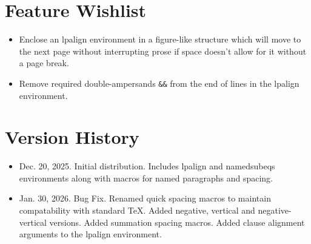 \documentclass{article}
\begin{document}
\section{Feature Wishlist}
\begin{itemize}
	\item[$\boxdot$] Enclose an \textsf{lpalign} environment in a figure-like structure which will move to the next page without interrupting prose if space doesn't allow for it without a page break. 
	\item[$\boxdot$] Remove required double-ampersands \verb|&&| from the end of lines in the \textsf{lpalign} environment.
\end{itemize}




\section{Version History}
	\begin{itemize}
	\item[v1.0] Dec. 20, 2025. Initial distribution. Includes \textsf{lpalign} and \textsf{namedsubeqs} environments along with macros for named paragraphs and spacing.
	\item[v1.1] Jan. 30, 2026. Bug Fix. Renamed quick spacing macros to maintain compatability with standard \TeX. Added negative, vertical and negative-vertical versions. Added summation spacing macros. Added clause alignment arguments to the \textsf{lpalign} environment.
	\end{itemize}
\end{document}
